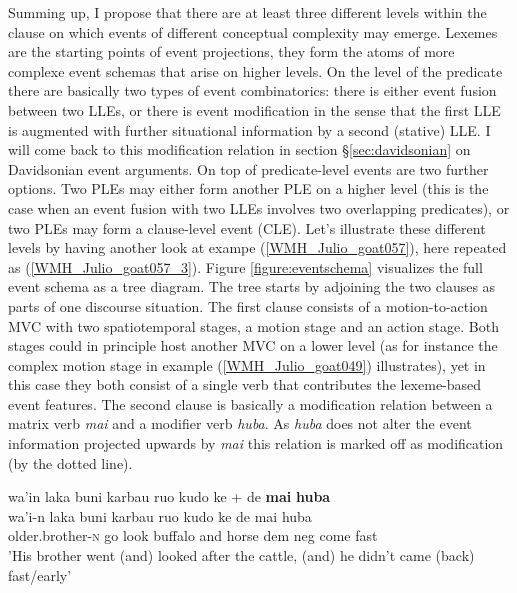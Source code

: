 Summing up, I propose that there are at least three different levels within the clause on which events of different conceptual complexity may emerge. Lexemes are the starting points of event projections, they form the atoms of more complexe event schemas that arise on higher levels. On the level of the predicate there are basically two types of event combinatorics: there is either event fusion between two LLEs, or there is event modification in the sense that the first LLE is augmented with further situational information by a second (stative) LLE. I will come back to this modification relation in section §\ref{sec:davidsonian} on Davidsonian event arguments. On top of predicate-level events are two further options. Two PLEs may either form another PLE on a higher level (this is the case when an event fusion with two LLEs involves two overlapping predicates), or two PLEs may form a clause-level event (CLE). Let's illustrate these different levels by having another look at exampe (\ref{WMH_Julio_goat057}), here repeated as (\ref{WMH_Julio_goat057_3}). Figure \ref{figure:eventschema} visualizes the full event schema as a tree diagram. The tree starts by adjoining the two clauses as parts of one discourse situation. The first clause consists of a motion-to-action MVC with two spatiotemporal stages, a motion stage and an action stage. Both stages could in principle host another MVC on a lower level (as for instance the complex motion stage in example (\ref{WMH_Julio_goat049}) illustrates), yet in this case they both consist of a single verb that contributes the lexeme-based event features. The second clause is basically a modification relation between a matrix verb \textit{mai} and a modifier verb \textit{huba}. As \textit{huba} does not alter the event information projected upwards by \textit{mai} this relation is marked off as modification (by the dotted line).

\pex \label{WMH_Julio_goat057_3}
\ea%
\gll wa'in laka buni karbau ruo kudo ke + de \textbf{mai} \textbf{huba} \\
wa'i-n laka buni karbau ruo kudo ke de mai huba \\
\glc older.brother-\textsc{n} go look buffalo and horse \acs{dem} \acs{neg} come fast\\
\glft 'His brother went (and) looked after the cattle, (and) he didn't came (back) fast/early' \ 
\z
\xe

